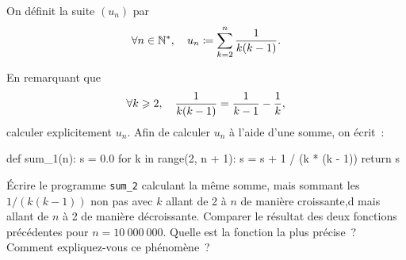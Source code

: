 \documentclass{magnoliaold}
\begin{document}
On définit la suite $(u_n)$ par
\[\forall n\in{\mathbb{N}^*},\quad u_n\coloneqq \sum_{k=2}^n \frac{1}{k(k-1)}.\]
\begin{questions}
\question En remarquant que
  \[\forall k\geqslant 2,\quad \frac{1}{k(k-1)}=\frac{1}{k-1} - \frac{1}{k},\]
  calculer explicitement $u_n$.
\question Afin de calculer $u_n$ à l'aide d'une somme, on écrit~:
\begin{pythoncodeline}
def sum_1(n):
    s = 0.0
    for k in range(2, n + 1):
        s = s + 1 / (k * (k - 1))
    return s
\end{pythoncodeline}
  Écrire le programme \verb!sum_2! calculant la même somme, mais sommant les $1/(k(k-1))$
  non pas avec $k$ allant de 2 à $n$ de manière croissante,d mais allant de $n$ à 2 de
  manière décroissante.
\question Comparer le résultat des deux fonctions précédentes pour $n = 10\ 000\ 000$.
  Quelle est la fonction la plus précise~? Comment expliquez-vous ce phénomène~?
\end{questions}





\end{document}
